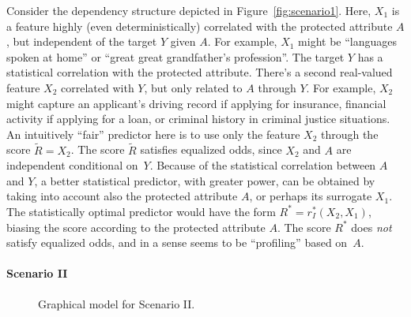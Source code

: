 Consider the dependency structure depicted in
Figure~\ref{fig:scenario1}.  Here, $X_1$ is a feature highly (even
deterministically) correlated with the protected attribute $A$, but
independent of the target $Y$ given $A$.  For example, $X_1$ might be
``languages spoken at home'' or ``great great grandfather's
profession''. The target $Y$ has a statistical correlation with the
protected attribute. There's a second real-valued feature $X_2$
correlated with $Y$, but only related to $A$ through $Y$. For example, $X_2$
might capture an applicant's driving record if applying for insurance,
financial activity if applying for a loan, or criminal history in
criminal justice situations. An intuitively ``fair'' predictor here is
to use only the feature $X_2$ through the score $\tilde{R} = X_2$.
The score $\tilde{R}$ satisfies equalized odds, since $X_2$ and $A$ are
independent conditional on~$Y$. Because of the statistical
correlation between $A$ and $Y$, a better statistical predictor, with
greater power, can be obtained by taking into account also the
protected attribute $A$, or perhaps its surrogate $X_1$. The
statistically optimal predictor would have the form
$R^*=r^*_{I}(X_2, X_1)$, biasing the score according to the protected
attribute $A$. The score $R^*$ does {\em not} satisfy equalized odds,
and in a sense seems to be ``profiling'' based on~$A.$

\paragraph{Scenario II}

\begin{figure}
\begin{center}
\end{center}
\caption{Graphical model for Scenario II.}
\label{fig:scenario2}
\end{figure}

